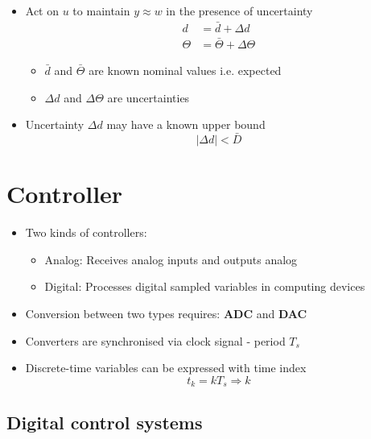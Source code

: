 \documentclass[conference]{IEEEtran}
\begin{document}
\begin{itemize}
    \item Act on $u$ to maintain $y \approx w$ in the presence of uncertainty
    \begin{align*}
        d  &= \bar{d} + \Delta d \\
        \Theta &= \bar{\Theta} + \Delta \Theta
    \end{align*}
    \begin{itemize}
        \item $\bar{d}$ and $\bar{\Theta}$ are known nominal values i.e. expected
        \item $\Delta d$ and $\Delta \Theta$ are uncertainties 
    \end{itemize}

    \item Uncertainty $\Delta d$ may have a known upper bound
    $$
        |\Delta d| < \bar{D}
    $$

\end{itemize}

\section{Controller}

\begin{itemize}
    \item Two kinds of controllers:
    \begin{itemize}
        \item Analog: Receives analog inputs and outputs analog 
        \item Digital: Processes digital sampled variables in computing devices
    \end{itemize}

    \item Conversion between two types requires: \textbf{ADC} and \textbf{DAC}
    \item Converters are synchronised via clock signal - period $T_s$
    \item Discrete-time variables can be expressed with time index
    $$
        t_k = kT_s \Rightarrow k
    $$
\end{itemize}

\subsection{Digital control systems}
\end{document}
